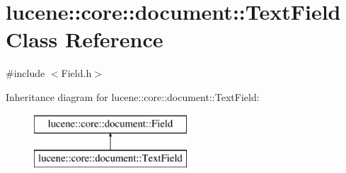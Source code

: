 \hypertarget{classlucene_1_1core_1_1document_1_1TextField}{}\section{lucene\+:\+:core\+:\+:document\+:\+:Text\+Field Class Reference}
\label{classlucene_1_1core_1_1document_1_1TextField}


{\ttfamily \#include $<$Field.\+h$>$}

Inheritance diagram for lucene\+:\+:core\+:\+:document\+:\+:Text\+Field\+:\begin{figure}[H]
\begin{center}
\leavevmode
\includegraphics[height=2.000000cm]{classlucene_1_1core_1_1document_1_1TextField}
\end{center}
\end{figure}
